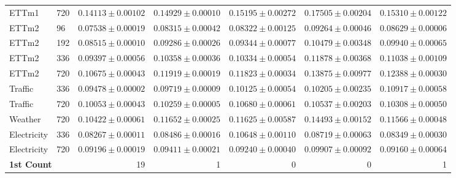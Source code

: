 \begin{table}[t]
\begin{tabular*}{\textwidth}{@{\extracolsep{\fill}}llrrrrr@{}}
ETTm1 & 720 & $\boldsymbol{0.14113\pm0.00102}$ & $0.14929\pm0.00010$ & $0.15195\pm0.00272$ & $0.17505\pm0.00204$ & $0.15310\pm0.00122$ \\
ETTm2 & 96 & $\boldsymbol{0.07538\pm0.00019}$ & $0.08315\pm0.00042$ & $0.08322\pm0.00125$ & $0.09264\pm0.00046$ & $0.08629\pm0.00006$ \\
ETTm2 & 192 & $\boldsymbol{0.08515\pm0.00010}$ & $0.09286\pm0.00026$ & $0.09344\pm0.00077$ & $0.10479\pm0.00348$ & $0.09940\pm0.00065$ \\
ETTm2 & 336 & $\boldsymbol{0.09397\pm0.00056}$ & $0.10358\pm0.00036$ & $0.10334\pm0.00054$ & $0.11878\pm0.00368$ & $0.11038\pm0.00109$ \\
ETTm2 & 720 & $\boldsymbol{0.10675\pm0.00043}$ & $0.11919\pm0.00019$ & $0.11823\pm0.00034$ & $0.13875\pm0.00977$ & $0.12388\pm0.00030$ \\
Traffic & 336 & $\boldsymbol{0.09478\pm0.00002}$ & $0.09719\pm0.00009$ & $0.10125\pm0.00054$ & $0.10205\pm0.00235$ & $0.10917\pm0.00058$ \\
Traffic & 720 & $\boldsymbol{0.10053\pm0.00043}$ & $0.10259\pm0.00005$ & $0.10680\pm0.00061$ & $0.10537\pm0.00203$ & $0.10308\pm0.00050$ \\
Weather & 720 & $\boldsymbol{0.10422\pm0.00061}$ & $0.11652\pm0.00025$ & $0.11625\pm0.00587$ & $0.14493\pm0.00152$ & $0.11566\pm0.00048$ \\
Electricity & 336 & $\boldsymbol{0.08267\pm0.00011}$ & $0.08486\pm0.00016$ & $0.10648\pm0.00110$ & $0.08719\pm0.00063$ & $0.08349\pm0.00030$ \\
Electricity & 720 & $0.09196\pm0.00019$ & $0.09411\pm0.00021$ & $0.09240\pm0.00040$ & $0.09907\pm0.00092$ & $\boldsymbol{0.09160\pm0.00064}$ \\
\midrule
\multicolumn{2}{l}{\textbf{1st Count}} & 19 & 1 & 0 & 0 & 1 \\
\bottomrule
\end{tabular*}
\end{table}

